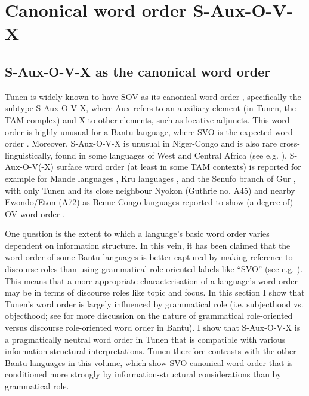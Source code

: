 \documentclass[output=paper,colorlinks,citecolor=brown
]{langscibook}
\begin{document}
\section{Canonical word order S-Aux-O-V-X} \label{secwordorder}
\subsection{S-Aux-O-V-X as the canonical word order}
Tunen is widely known to have SOV as its canonical word order \citep{Dugast1971, Bearth2003, Mous1997, Mous2003, Mous2005, Mous2014, Kerr2024, KerrFut}, specifically the subtype S-Aux-O-V-X, where Aux refers to an auxiliary element (in Tunen, the TAM complex) and X to other elements, such as locative adjuncts. This word order is highly unusual for a Bantu language, where SVO is the expected word order \citep{Bearth2003}. Moreover, S-Aux-O-V-X is unusual in Niger-Congo and is also rare cross-linguistically, found in some languages of West and Central Africa (see e.g. \citealt{DryerGensler2005, GenslerGüldemann2003, Güldemann2008}). S-Aux-O-V(-X) surface word order (at least in some TAM contexts) is reported for example for Mande languages \citep{Claudi1993, Creissels2005, Nikitina2011, SandeEtAl2019}, Kru languages \citep{Gensler1994, SandeEtAl2019}, and the Senufo branch of Gur \citep{Gensler1994}, with only Tunen and its close neighbour Nyokon (Guthrie no. A45) and nearby Ewondo/Eton (A72) as Benue-Congo languages reported to show (a degree of) OV word order \citep{Mous2005,Mous2014,Kerr2024,KerrFut}. 

One question is the extent to which a language's basic word order varies dependent on information structure. In this vein, it has been claimed that the word order of some Bantu languages is better captured by making reference to discourse roles than using grammatical role-oriented labels like ``SVO'' (see e.g. \citealt{Morimoto2000, Morimoto2006, Good2010, Yoneda2011, KerrEtAl2023}). This means that a more appropriate characterisation of a language's word order may be in terms of discourse roles like topic and focus. In this section I show that Tunen's word order is largely influenced by grammatical role (i.e. subjecthood vs. objecthood; see \citealt{KerrEtAl2023} for more discussion on the nature of grammatical role-oriented versus discourse role-oriented word order in Bantu). I show that S-Aux-O-V-X is a pragmatically neutral word order in Tunen that is compatible with various information-structural interpretations. Tunen therefore contrasts with the other Bantu languages in this volume, which show SVO canonical word order that is conditioned more strongly by information-structural considerations than by grammatical role. 
\end{document}
